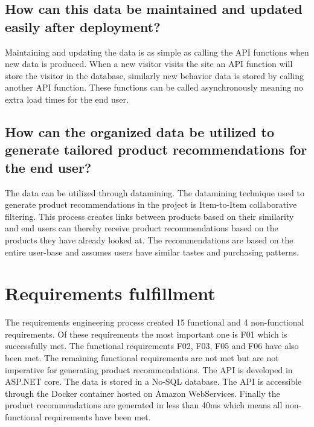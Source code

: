\subsection{How can this data be maintained and updated easily after deployment?}
Maintaining and updating the data is as simple as calling the API functions when new data is produced. When a new visitor visits the site an API function will store the visitor in the database, similarly new behavior data is stored by calling another API function. These functions can be called asynchronously meaning no extra load times for the end user.

\subsection{How can the organized data be utilized to generate tailored product recommendations for the end user?}
The data can be utilized through datamining. The datamining technique used to generate product recommendations in the project is Item-to-Item collaborative filtering. This process creates links between products based on their similarity and end users can thereby receive product recommendations based on the products they have already looked at. The recommendations are based on the entire user-base and assumes users have similar tastes and purchasing patterns.

\section{Requirements fulfillment}
The requirements engineering process created 15 functional and 4 non-functional requirements. Of these requirements the most important one is F01 which is successfully met. The functional requirements F02, F03, F05 and F06 have also been met. The remaining functional requirements are not met but are not imperative for generating product recommendations. The API is developed in ASP.NET core. The data is stored in a No-SQL database. The API is accessible through the Docker container hosted on Amazon WebServices. Finally the product recommendations are generated in less than 40ms which means all non-functional requirements have been met.
